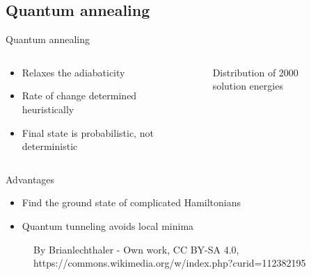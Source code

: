 \documentclass[handout]{beamer}
\begin{document}
\subsection{Quantum annealing}

\begin{frame}{Quantum annealing}
    \begin{columns}
        \begin{column}{0.5\textwidth}
            \begin{itemize}[<+(1)->]
                \item Relaxes the adiabaticity
                \item Rate of change determined heuristically
                \item Final state is probabilistic, not deterministic
            \end{itemize}
        \end{column}
        \begin{column}{0.5\textwidth}
            \begin{figure}
                \resizebox{\textwidth}{!}{}
                \caption{Distribution of 2000 solution energies}
            \end{figure}
        \end{column}
    \end{columns}

\end{frame}

\begin{frame}{Advantages}

    \begin{itemize}[<+(1)->]
        \item Find the ground state of complicated Hamiltonians
        \item Quantum tunneling avoids local minima
    \end{itemize}

    \begin{figure}
        {
            \def\svgwidth{.7\textwidth}
            \tiny\selectfont
            
        }
        \caption{By Brianlechthaler - Own work, CC BY-SA 4.0, https://commons.wikimedia.org/w/index.php?curid=112382195}
    \end{figure}

    
\end{frame}
\end{document}

